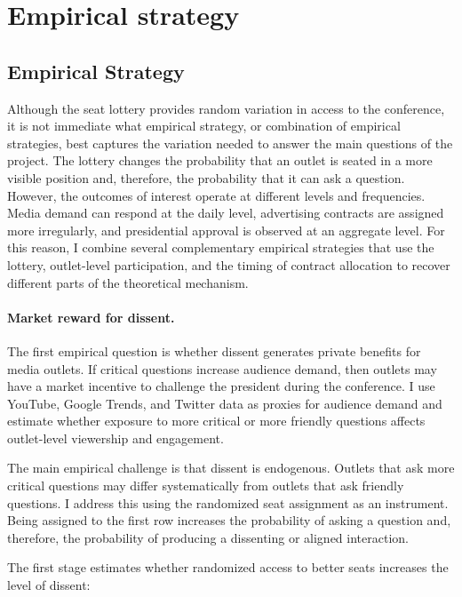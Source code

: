 \section{Empirical strategy}
\label{sec:emp_strategy}

\subsection{Empirical Strategy}

Although the seat lottery provides random variation in access to the conference, it is not immediate what empirical strategy, or combination of empirical strategies, best captures the variation needed to answer the main questions of the project. The lottery changes the probability that an outlet is seated in a more visible position and, therefore, the probability that it can ask a question. However, the outcomes of interest operate at different levels and frequencies. Media demand can respond at the daily level, advertising contracts are assigned more irregularly, and presidential approval is observed at an aggregate level. For this reason, I combine several complementary empirical strategies that use the lottery, outlet-level participation, and the timing of contract allocation to recover different parts of the theoretical mechanism.

\paragraph{Market reward for dissent.}

The first empirical question is whether dissent generates private benefits for media outlets. If critical questions increase audience demand, then outlets may have a market incentive to challenge the president during the conference. I use YouTube, Google Trends, and Twitter data as proxies for audience demand and estimate whether exposure to more critical or more friendly questions affects outlet-level viewership and engagement.

The main empirical challenge is that dissent is endogenous. Outlets that ask more critical questions may differ systematically from outlets that ask friendly questions. I address this using the randomized seat assignment as an instrument. Being assigned to the first row increases the probability of asking a question and, therefore, the probability of producing a dissenting or aligned interaction.

The first stage estimates whether randomized access to better seats increases the level of dissent:

